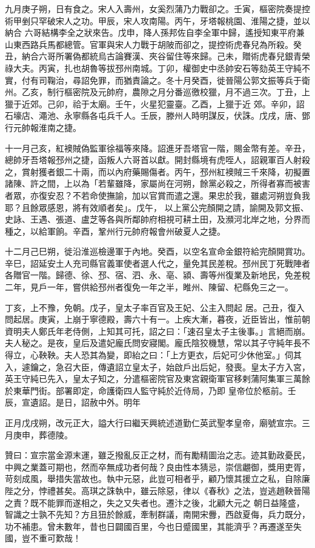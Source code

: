 \begin{pinyinscope}
 九月庚子朔，日有食之。宋人入壽州，女奚烈蒲乃力戰卻之。壬寅，樞密院奏提控術甲剉只罕破宋人之功。甲辰，宋人攻南陽。丙午，牙塔報桃園、淮陽之捷，並以納合
 六哥結構李全之狀來告。戊申，降人孫邦佐自李全軍中歸，遙授知東平府兼山東西路兵馬都總管。官軍與宋人力戰于胡陂而卻之，提控術虎春兒為所殺。癸丑，納合六哥所署偽都統烏古論賽漢、夾谷留住等來歸。己未，贈術虎春兒銀青榮祿大夫。丙寅，扎也胡魯等拔邳州南城。丁卯，權御史中丞帥安石等劾英王守純不實，付有司鞠治，尋詔免罪，而猶責論之。冬十月癸酉，徙晉陽公郭文振等兵于衛州。乙亥，制行樞密院及元帥府，農隙之月分番巡徼校獵，月不過三次。丁丑，上獵于近郊。己卯，祫于太廟。壬午，火星犯靈臺。乙酉，上獵于近
 郊。辛卯，詔石壕店、澠池、永寧縣各屯兵千人。壬辰，滕州人時明謀反，伏誅。戊戌，唐、鄧行元帥報淮南之捷。



 十一月己亥，紅襖賊偽監軍徐福等來降。詔進牙吾塔官一階，賜金幣有差。辛丑，總帥牙吾塔報邳州之捷，函叛人六哥首以獻。開封縣境有虎咥人，詔親軍百人射殺之，賞射獲者銀二十兩，而以內府藥賜傷者。丙午，邳州紅襖賊三千來降，初擬置諸陳、許之間，上以為「若輩雖降，家屬尚在河朔，餘黨必殺之，所得者寡而被害者眾，亦復安忍？不若命使撫諭，加以官賞而遣之還。果忠於我，雖處河朔豈負我耶？且餘眾感恩，將有效順者矣」。戊午，
 以上黨公完顏開之請，諭開及郭文振、史詠、王遇、張道、盧芝等各與所鄰帥府相視可耕土田，及瀕河北岸之地，分界而種之，以給軍餉。辛酉，鞏州行元帥府報會州破夏人之捷。



 十二月己巳朔，徙沿淮巡檢邊軍于內地。癸酉，以空名宣命金銀符給完顏開賞功。辛巳，詔延安土人充司縣官義軍使者選人代之，量免其民差稅。邳州民丁死戰陣者各贈官一階。歸德、徐、邳、宿、泗、永、亳、潁、壽等州復業及新地民，免差稅二年，見戶一年，嘗供給邳州者復免一年之半，睢州、陳留、杞縣免三之一。



 丁亥，上不豫，免朝。戊子，皇太子率百官及王妃、公主入問起
 居。己丑，復入問起居。庚寅，上崩于寧德殿，壽六十有一。上疾大漸，暮夜，近臣皆出，惟前朝資明夫人鄭氏年老侍側，上知其可托，詔之曰：「速召皇太子主後事。」言絕而崩。夫人秘之。是夜，皇后及遣妃龐氏問安寢閣。龐氏陰狡機慧，常以其子守純年長不得立，心鞅鞅。夫人恐其為變，即紿之曰：「上方更衣，后妃可少休他室。」伺其入，遽鑰之，急召大臣，傳遺詔立皇太子，始啟戶出后妃，發喪。皇太子方入宮，英王守純已先入，皇太子知之，分遣樞密院官及東宮親衛軍官移剌蒲阿集軍三萬餘於東華門街。部署即定，命護衛四人監守純於近侍局，乃即
 皇帝位於柩前。壬辰，宣遺詔。是日，詔赦中外。明年



 正月戊戌朔，改元正大，謚大行曰繼天興統述道勤仁英武聖孝皇帝，廟號宣宗。三月庚申，葬德陵。



 贊曰：宣宗當金源末運，雖乏撥亂反正之材，而有勵精圖治之志。迹其勤政憂民，中興之業蓋可期也，然而卒無成功者何哉？良由性本猜忌，崇信翽御，獎用吏胥，苛刻成風，舉措失當故也。執中元惡，此豈可相者乎，顧乃懷其援立之私，自除廉陛之分，悖禮甚矣。高琪之誅執中，雖云除惡，律以《春秋》之法，豈逃趙鞅晉陽之責？既不能罪而遂相之，失之又失者也。遷汴之後，北顧大元之
 朝日益隆盛，智識之士孰不先知？方且狃於餘威，牽制群議，南開宋釁，西啟夏侮，兵力既分，功不補患。曾未數年，昔也日闢國百里，今也日蹙國里，其能濟乎？再遷遂至失國，豈不重可歎哉！



\end{pinyinscope}